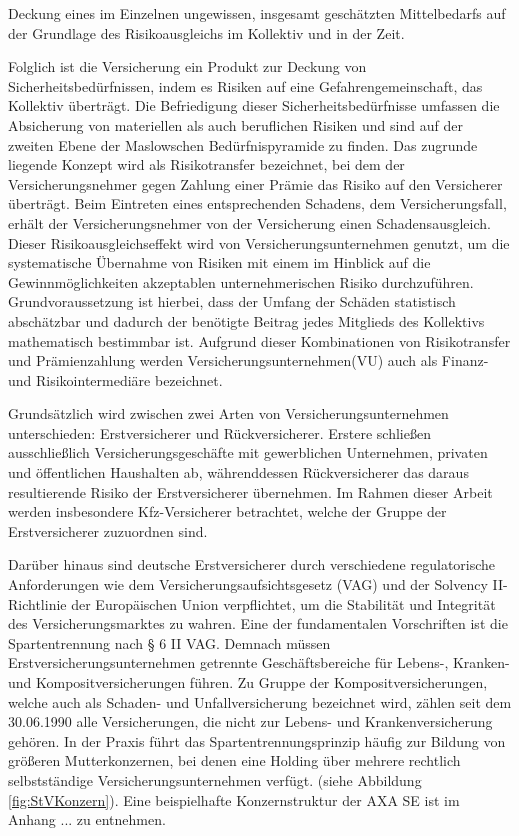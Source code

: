 \glqq Deckung eines im Einzelnen ungewissen, insgesamt geschätzten Mittelbedarfs auf der Grundlage des Risikoausgleichs im Kollektiv und in der Zeit.\grqq \autocite[S. 8f.]{FARNY2011}

Folglich ist die Versicherung ein Produkt zur Deckung von Sicherheitsbedürfnissen, indem es Risiken auf eine Gefahrengemeinschaft, das Kollektiv überträgt. Die Befriedigung dieser Sicherheitsbedürfnisse umfassen die Absicherung von materiellen als auch beruflichen Risiken und sind auf der zweiten Ebene der Maslowschen Bedürfnispyramide zu finden. \autocite[Vgl.][S. 30]{BECKER2019} Das zugrunde liegende Konzept wird als Risikotransfer bezeichnet, bei dem der Versicherungsnehmer gegen Zahlung einer Prämie das Risiko auf den Versicherer überträgt. Beim Eintreten eines entsprechenden Schadens, dem Versicherungsfall, erhält der Versicherungsnehmer von der Versicherung einen Schadensausgleich. Dieser Risikoausgleichseffekt wird von Versicherungsunternehmen genutzt, um die systematische Übernahme von Risiken mit einem im Hinblick auf die Gewinnmöglichkeiten akzeptablen unternehmerischen Risiko durchzuführen. \autocite[Vgl.][S. 9]{FARNY2011}
Grundvoraussetzung ist hierbei, dass der Umfang der Schäden statistisch abschätzbar und dadurch der benötigte Beitrag jedes Mitglieds des Kollektivs mathematisch bestimmbar ist. Aufgrund dieser Kombinationen von Risikotransfer und Prämienzahlung werden Versicherungsunternehmen(VU) auch als Finanz- und Risikointermediäre bezeichnet. \autocite[Vgl.][S. 53]{ZWACK2017}

Grundsätzlich wird zwischen zwei Arten von Versicherungsunternehmen unterschieden: Erstversicherer und Rückversicherer. Erstere schließen ausschließlich Versicherungsgeschäfte mit gewerblichen Unternehmen, privaten und öffentlichen Haushalten ab, währenddessen Rückversicherer das daraus resultierende Risiko der Erstversicherer übernehmen.\autocite[Vgl.][S. 240f.]{FARNY2011} Im Rahmen dieser Arbeit werden insbesondere Kfz-Versicherer betrachtet, welche der Gruppe der Erstversicherer zuzuordnen sind.

Darüber hinaus sind deutsche Erstversicherer durch verschiedene regulatorische Anforderungen wie dem Versicherungsaufsichtsgesetz (VAG) und der Solvency II-Richtlinie der Europäischen Union verpflichtet, um die Stabilität und Integrität des Versicherungsmarktes zu wahren. \autocite[Vgl.][]{BAFIN2016} Eine der fundamentalen Vorschriften ist die Spartentrennung nach § 6 II VAG. Demnach müssen Erstversicherungsunternehmen getrennte Geschäftsbereiche für Lebens-, Kranken- und Kompositversicherungen führen. Zu Gruppe der Kompositversicherungen, welche auch als Schaden- und Unfallversicherung bezeichnet wird, zählen seit dem 30.06.1990 alle Versicherungen, die nicht zur Lebens- und Krankenversicherung gehören. \autocite[Vgl.][S. 241-243]{FARNY2011} In der Praxis führt das Spartentrennungsprinzip häufig zur Bildung von größeren Mutterkonzernen, bei denen eine Holding über mehrere rechtlich selbstständige Versicherungsunternehmen verfügt. (siehe Abbildung \vref{fig:StVKonzern}). Eine beispielhafte Konzernstruktur der AXA SE ist im Anhang ... zu entnehmen. 

